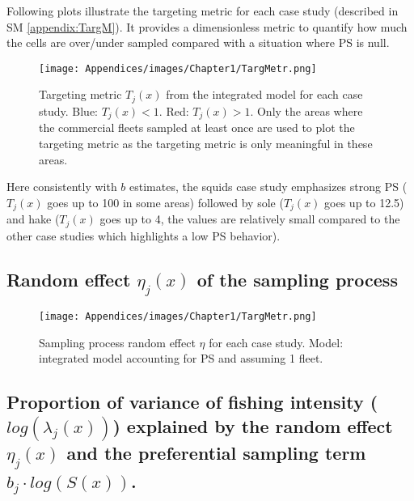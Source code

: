 Following plots illustrate the targeting metric for each case study (described in SM \ref{appendix:TargM}). It provides a dimensionless metric to quantify how much the cells are over/under sampled compared with a situation where PS is null.

\begin{figure}[H]
   \begin{center}
      \texttt{[image: Appendices/images/Chapter1/TargMetr.png]}
   \end{center}
   \caption[Targeting metric \(T_j(x)\) from the integrated model for each case study.]
   {Targeting metric \(T_j(x)\) from the integrated model for each case study. Blue: \(T_j(x)<1\). Red: \(T_j(x)>1\). Only the areas where the commercial fleets sampled at least once are used to plot the targeting metric as the targeting metric is only meaningful in these areas.}
   \label{fig:TargMetr}
\end{figure}

Here consistently with \(b\) estimates, the squids case study emphasizes strong PS (\(T_j (x)\) goes up to 100 in some areas) followed by sole (\(T_j(x)\) goes up to 12.5) and hake (\(T_j(x)\) goes up to 4, the values are relatively small compared to the other case studies which highlights a low PS behavior).

\newpage

\subsection{Random effect \(\eta_j(x)\) of the sampling process}\label{appendix:MapEta}

\begin{figure}[H]
   \begin{center}
      \texttt{[image: Appendices/images/Chapter1/TargMetr.png]}
   \end{center}
   \caption[Sampling process random effect \(\boldsymbol{\eta}\) for each case study.]
   {Sampling process random effect \(\eta\) for each case study. Model: integrated model accounting for PS and assuming 1 fleet.}
   \label{fig:MapEta}
\end{figure}

\newpage

\subsection{Proportion of variance of fishing intensity (\(log(\lambda_j (x))\)) explained by the random effect \(\eta_j(x)\) and the preferential sampling term \(b_j \cdot log(S(x))\).}\label{appendix:ProprVarSP}


